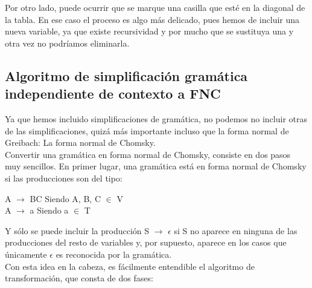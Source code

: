 \documentclass[12pt,a4paper,spanish]{book}
\begin{document}
Por otro lado, puede ocurrir que se marque una casilla que est\'e en la diagonal de la tabla. En ese caso el proceso es algo m\'as delicado, pues hemos de incluir una nueva variable, ya que existe recursividad y por mucho que se sustituya una y otra vez no podr\'iamos eliminarla.


\subsection{Algoritmo de simplificaci\'on gram\'atica independiente de contexto a FNC\\}
Ya que hemos incluido simplificaciones de gram\'atica, no podemos no incluir otras de las simplificaciones, quiz\'a m\'as importante incluso que la forma normal de Greibach: La forma normal de Chomsky.\\
\newline
Convertir una gram\'atica en forma normal de Chomsky, consiste en dos pasos muy sencillos. En primer lugar, una gram\'atica est\'a en forma normal de Chomsky si las producciones son del tipo:
\begin{center}
A $\rightarrow$ BC 	Siendo A, B, C $\in$ V\\
A $\rightarrow$ a        Siendo a $\in$  T
\end{center}
Y s\'olo se puede incluir la producci\'on S $\rightarrow$ $\epsilon$ si S no aparece en ninguna de las producciones del resto de variables y, por supuesto,  aparece en los casos que \'unicamente $\epsilon$ es reconocida por la gram\'atica.\\
\newline
Con esta idea en la cabeza, es f\'acilmente entendible el algoritmo de transformaci\'on, que consta de dos fases:
\end{document}
